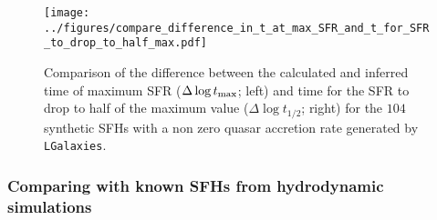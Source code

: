 \documentclass[useAMS,usenatbib]{mn2e}
\begin{document}
\begin{figure}
\centering
\texttt{[image: ../figures/compare\_difference\_in\_t\_at\_max\_SFR\_and\_t\_for\_SFR\_to\_drop\_to\_half\_max.pdf]}
\caption{Comparison of the difference between the calculated and inferred time of maximum SFR ($\Delta \log t_{\rm{max}}$; left) and time for the SFR to drop to half of the maximum value ($\Delta \log t_{1/2}$; right) for the $104$ synthetic SFHs with a non zero quasar accretion rate generated by \texttt{LGalaxies}.}
\label{fig:genlgalsfhs}
\end{figure}






\subsubsection{Comparing with known SFHs from hydrodynamic simulations}\label{sec:lgalaxies}
\end{document}

